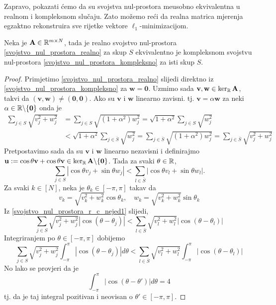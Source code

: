 \documentclass[a4paper,twoside,12pt]{memoir} %
\newcommand{\vect}[1]{\mathbf{#1}}
\renewcommand{\vec}{\vect}
\begin{document}
\noindent
Zapravo, pokazati \'cemo da su svojstva nul-prostora me\dj usobno ekvivalentna u realnom i kompleksnom slu\v{c}aju. Zato mo\v{z}emo re\'ci da realna matrica mjerenja egzaktno rekonstruira sve rijetke vektore $\ell_1$-minimizacijom. 
\begin{thm}
    Neka je $\vec A \in \R^{m \times N}$, tada je realno svojstvo nul-prostora \eqref{svojstvo_nul_prostora_realno} za skup $S$ ekvivalentno je kompleksnom svojstvu nul-prostora \eqref{svojstvo_nul_prostora_kompleksno} za isti skup $S$.
\end{thm}
\begin{proof}
    Primjetimo \eqref{svojstvo_nul_prostora_realno} slijedi direktno iz \eqref{svojstvo_nul_prostora_kompleksno} za $\vec w = \vec 0$. Uzmimo sada $\vec v, \vec w \in \ker_{\R}\vec A$, takvi da $(\vec v, \vec w) \neq (\vec 0, \vec 0)$. Ako su $\vec v$ i $\vec w$ linearno zavisni. tj. $\vec v = \alpha \vec w$ za neki $\alpha \in \R \backslash \{ \vec 0 \}$ onda je 
   \begin{align*}
       \sum_{j \in S} \sqrt{v_j^2+w_j^2} &=  \sum_{j \in S} \sqrt{(1+\alpha^2)w_j^2}=\sqrt{1+\alpha^2}\sum_{j \in S} \sqrt{w_j^2}\\
       &< \sqrt{1+\alpha^2}\sum_{j \in \bar S} \sqrt{w_j^2} = \sum_{j \in \bar S} \sqrt{(1+\alpha^2)w_j^2} = \sum_{j \in \bar S} \sqrt{v_j^2+w_j^2}
   \end{align*} 
   Pretpostavimo sada da su $\vec v$ i $\vec w$ linearno nezavisni i definirajmo $\vec u := \cos \theta \vec v + \cos \theta \vec v \in \ker_{\R} \vec A \backslash \{\vec 0\}$. Tada za svaki $\theta \in \mathbb{R}$,
   \begin{equation}\label{svojstvo_nul_prostora_r_c_nejed1}
       \sum_{j \in S} |\cos \theta v_j + \sin \theta w_j| < \sum_{l \in \bar S} |\cos \theta v_l + \sin \theta w_l|.
   \end{equation}
   Za svaki $k \in [N]$, neka je $\theta_k \in [-\pi, \pi]$ takav da
   \begin{equation*}
       v_k = \sqrt{v_k^2 + w_k^2}\cos{\theta_k}, \quad w_k = \sqrt{v_k^2 + w_k^2}\sin{\theta_k}
   \end{equation*}
   Iz \eqref{svojstvo_nul_prostora_r_c_nejed1} slijedi,
   \begin{equation*}
       \sum_{j \in S}\sqrt{v_j^2+w_j^2}|\cos(\theta - \theta_j)|<\sum_{l \in \bar S}\sqrt{v_l^2+w_l^2}|\cos(\theta - \theta_l)|
   \end{equation*}
   Integriranjem po $\theta \in [-\pi,\pi]$ dobijemo
   \begin{equation*}
       \sum_{j \in S}\sqrt{v_j^2+w_j^2}\int_{-\pi}^{\pi}  |\cos(\theta - \theta_j)| d \theta<\sum_{l \in \bar S}\sqrt{v_l^2+w_l^2}\int_{-\pi}^{\pi}  |\cos(\theta - \theta_l)|
   \end{equation*}
    No lako se provjeri da je
    \begin{equation*}
         \int_{-\pi}^{\pi}  |\cos(\theta - \theta')| d \theta = 4
    \end{equation*}
    tj. da je taj integral pozitivan i neovisan o $\theta' \in [-\pi, \pi]$.
\end{proof}
\end{document}

